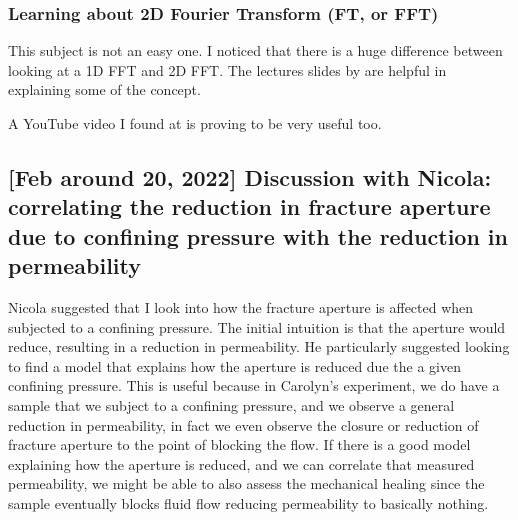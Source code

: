 \documentclass[12pt,titlepage]{article}
\begin{document}
\subsubsection{Learning about 2D Fourier Transform (FT, or FFT)}
This subject is not an easy one. I noticed that there is a huge difference between looking at a 1D FFT and 2D FFT. The lectures slides by \citep{Zisserman2014} are helpful in explaining some of the concept.

A YouTube video I found at \cite{Cohen2017} is proving to be very useful too. 

\subsection{[Feb around 20, 2022] Discussion with Nicola: correlating the reduction in fracture aperture due to confining pressure with the reduction in permeability} Nicola suggested that I look into how the fracture aperture is affected when subjected to a confining pressure. The initial intuition is that the aperture would reduce, resulting in a reduction in permeability. He particularly suggested looking to find a model that explains how the aperture is reduced due the a given confining pressure. This is useful because in Carolyn's experiment, we do have a sample that we subject to a confining pressure, and we observe a general reduction in permeability, in fact we even observe the closure or reduction of fracture aperture to the point of blocking the flow. If there is a good model explaining how the aperture is reduced, and we can correlate that measured permeability, we might be able to also assess the mechanical healing since the sample eventually blocks fluid flow reducing permeability to basically nothing.
\end{document}
